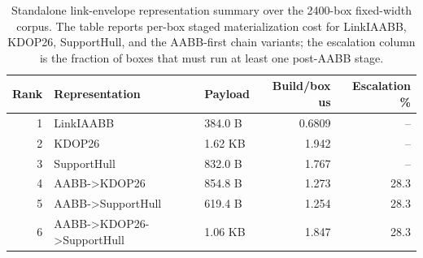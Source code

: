 \begin{table}[t]
\centering
\caption{Standalone link-envelope representation summary over the 2400-box fixed-width corpus. The table reports per-box staged materialization cost for LinkIAABB, KDOP26, SupportHull, and the AABB-first chain variants; the escalation column is the fraction of boxes that must run at least one post-AABB stage.}
\label{tab:tro_appendix_rbf_only_sweep}
\footnotesize
\setlength{\tabcolsep}{2.30pt}
\renewcommand{\arraystretch}{0.95}
\begin{tabular}{rllrr}
\toprule
Rank & Representation & Payload & Build/box us & Escalation \% \\
\midrule
1 & LinkIAABB & 384.0 B & 0.6809 & -- \\
2 & KDOP26 & 1.62 KB & 1.942 & -- \\
3 & SupportHull & 832.0 B & 1.767 & -- \\
4 & AABB->KDOP26 & 854.8 B & 1.273 & 28.3 \\
5 & AABB->SupportHull & 619.4 B & 1.254 & 28.3 \\
6 & AABB->KDOP26->SupportHull & 1.06 KB & 1.847 & 28.3 \\
\bottomrule
\end{tabular}
\end{table}
